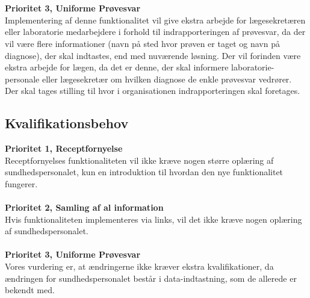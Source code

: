 \\\\
\textbf{Prioritet 3, Uniforme Prøvesvar} \\
Implementering af denne funktionalitet vil give ekstra arbejde for lægesekretæren eller laboratorie medarbejdere i forhold til indrapporteringen af prøvesvar, da der vil være flere informationer (navn på sted hvor prøven er taget og navn på diagnose), der skal indtastes, end med nuværende løsning. Der vil forinden være ekstra arbejde for lægen, da det er denne, der skal informere laboratorie-personale eller lægesekretær om hvilken diagnose de enkle prøvesvar vedrører.\\
Der skal tages stilling til hvor i organisationen indrapporteringen skal foretages.
\subsection{Kvalifikationsbehov}
\textbf{Prioritet 1, Receptfornyelse} \\
Receptfornyelses funktionaliteten vil ikke kræve nogen større oplæring af sundhedspersonalet, kun en introduktion til hvordan den nye funktionalitet fungerer.
\\\\
\textbf{Prioritet 2, Samling af al information} \\
Hvis funktionaliteten implementeres via links, vil det ikke kræve nogen oplæring af sundhedspersonalet.
\\\\
\textbf{Prioritet 3, Uniforme Prøvesvar} \\
Vores vurdering er, at ændringerne ikke kræver ekstra kvalifikationer, da ændringen for sundhedspersonalet består i data-indtastning, som de allerede er bekendt med.